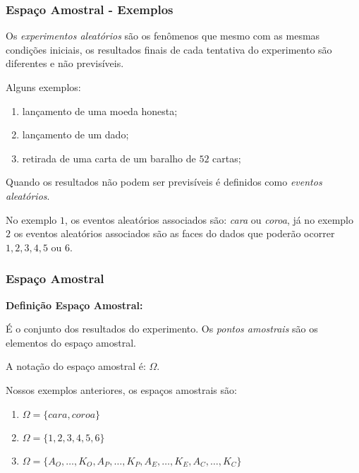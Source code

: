 \documentclass[hyperref={pdfpagelabels=false}]{beamer}
\begin{document}
\begin{frame}
\frametitle{Espaço Amostral - Exemplos}
	
Os {\it experimentos aleatórios} são os fenômenos que mesmo com as mesmas condições iniciais, os resultados finais de cada tentativa do experimento são diferentes e não previsíveis.

\pause 

Alguns exemplos:
{\begin{enumerate}
		\item lançamento de uma moeda honesta;
		\pause
		\item lançamento de um dado;
		\pause
		\item retirada de uma carta de um baralho de $52$ cartas;
\end{enumerate}}

\pause
Quando os resultados não podem ser previsíveis é definidos como {\it eventos aleatórios}.

\pause
No exemplo $1$, os eventos aleatórios associados são: {\it cara} ou {\it coroa}, já no exemplo $2$ os eventos aleatórios associados são as faces do dados que poderão ocorrer $1, 2, 3, 4, 5$ ou $6$.
	
\end{frame}


\begin{frame}
\frametitle{Espaço Amostral}

{\bf Definição Espaço Amostral:}

É o conjunto dos resultados do experimento. Os {\it pontos amostrais} são os elementos do espaço amostral. 

\pause

A notação do espaço amostral é: $\Omega$.

\pause
Nossos exemplos anteriores, os espaços amostrais são:
\begin{enumerate}
	\item $\Omega = \{ cara, coroa \}$
	\pause
	\item $\Omega = \{ 1,2,3,4,5,6 \}$
	\pause
	\item $\Omega = \{ A_O,\dots,K_O, A_P,\dots,K_P, A_E,\dots, K_E, A_C,\dots, K_C \}$
\end{enumerate}

\end{frame}
\end{document}
